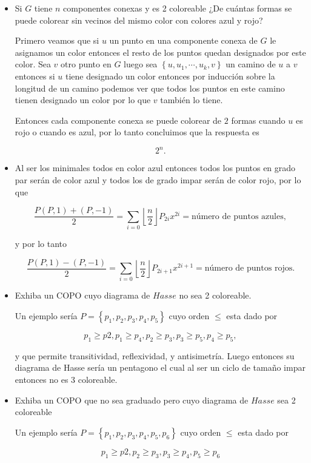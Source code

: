 \documentclass[letterpaper]{article}
\theoremstyle{definition}
\theoremstyle{lemathm}
\theoremstyle{lemademthm}
\newcommand{\floor}[1]{\left \lfloor #1 \right\rfloor }
\newcommand{\set}[1]{\left \{ #1 \right\} }
\newcommand{\1}{\mathbbm{1}}
\begin{document}
\begin{enumerate}
\begin{itemize}
			\item Si $G$ tiene $n$ componentes conexas y es 2 coloreable ¿De cuántas formas se puede colorear sin vecinos del mismo color con colores azul y rojo?
			
			Primero veamos que si $u$ un punto en una componente conexa de $G$ le asignamos un color entonces el resto de los puntos quedan designados por este color. Sea $v$ otro punto en $G$ luego sea $\set{u,u_1,\cdots,u_{k},v}$ un camino de $u$ a $v$ entonces si $u$ tiene designado un color entonces por inducción sobre la longitud de un camino podemos ver que todos los puntos en este camino tienen designado un color por lo que $v$ también lo tiene.

			Entonces cada componente conexa se puede colorear de $2$ formas cuando $u$ es rojo o cuando es azul, por lo tanto concluimos que la respuesta es

			\[2^n.\]

			\item Al ser los minimales todos en color azul entonces todos los puntos en grado par serán de color azul y todos los de grado impar serán de color rojo, por lo que
			
			\[\frac{P(P,1) + (P,-1)}{2} = \sum_{i=0}{\floor{\frac{n}{2}}} P_{2i}x^{2i} = \text{número de puntos azules},\]

			y por lo tanto

			\[\frac{P(P,1) - (P,-1)}{2} = \sum_{i=0}{\floor{\frac{n}{2}}} P_{2i+1}x^{2i+1} = \text{número de puntos rojos}.\]
			
			\item Exhiba un COPO cuyo diagrama de $Hasse$ no sea 2 coloreable.
			
			Un ejemplo sería $P = \set{p_1,p_2,p_3,p_4,p_5}$ cuyo orden $\leq$ esta dado por

			\[p_1 \geq p2, p_1 \geq p_4, p_2 \geq p_3, p_3 \geq p_5, p_4 \geq p_5,\]

			y que permite transitividad, reflexividad, y antisimetría. Luego entonces su diagrama de Hasse sería un pentagono el cual al ser un ciclo de tamaño impar entonces no es 3 coloreable.
			
			\item Exhiba un COPO que no sea graduado pero cuyo diagrama de $Hasse$ sea 2 coloreable
			
			Un ejemplo sería $P = \set{p_1,p_2,p_3,p_4,p_5,p_6}$ cuyo orden $\leq$ esta dado por

			\[p_1 \geq p2, p_2 \geq p_3, p_3 \geq p_4, p_5 \geq p_6\]


\end{itemize}
\end{enumerate}
\end{document}
